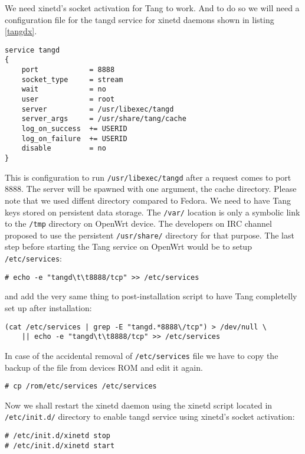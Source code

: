 We need xinetd's socket activation for Tang to work.
And to do so we will need a configuration file for the tangd service for xinetd daemons shown in listing \ref{tangdx}.
\begin{lstlisting}[columns=fixed,basicstyle=\ttfamily\footnotesize,tabsize=4,backgroundcolor=\color{yellow!10},caption=Configuration of Tang service for xinetd,label=tangdx]
service tangd
{
    port            = 8888
    socket_type     = stream
    wait            = no
    user            = root
    server          = /usr/libexec/tangd
    server_args     = /usr/share/tang/cache
    log_on_success  += USERID
    log_on_failure  += USERID
    disable         = no
}
\end{lstlisting}
This is configuration to run {\tt /usr/libexec/tangd} after a request comes to port 8888.
The server will be spawned with one argument, the cache directory.
Please note that we used diffent directory compared to Fedora.
We need to have Tang keys stored on persistent data storage.
The {\tt /var/} location is only a symbolic link to the {\tt /tmp} directory on OpenWrt device.
The developers on IRC channel proposed to use the persistent {\tt /usr/share/} directory for that purpose.
The last step before starting the Tang service on OpenWrt would be to setup {\tt /etc/services}:
\begin{lstlisting}[columns=fixed,basicstyle=\ttfamily\footnotesize,tabsize=4,backgroundcolor=\color{yellow!10}]
# echo -e "tangd\t\t8888/tcp" >> /etc/services
\end{lstlisting}
and add the very same thing to post-installation script to have Tang completelly set up after installation:
\begin{lstlisting}[columns=fixed,basicstyle=\ttfamily\footnotesize,tabsize=4,backgroundcolor=\color{yellow!10}]
(cat /etc/services | grep -E "tangd.*8888\/tcp") > /dev/null \
    || echo -e "tangd\t\t8888/tcp" >> /etc/services
\end{lstlisting}
In case of the accidental removal of {\tt /etc/services} file we have to copy the backup of the file from devices ROM and edit it again.
\begin{lstlisting}[columns=fixed,basicstyle=\ttfamily\footnotesize,tabsize=4,backgroundcolor=\color{yellow!10}]
# cp /rom/etc/services /etc/services
\end{lstlisting}
Now we shall restart the xinetd daemon using the xinetd script located in {\tt /etc/init.d/} directory to enable tangd service using xinetd's socket activation:
\begin{lstlisting}[columns=fixed,basicstyle=\ttfamily\footnotesize,tabsize=4,backgroundcolor=\color{yellow!10}]
# /etc/init.d/xinetd stop
# /etc/init.d/xinetd start
\end{lstlisting}
